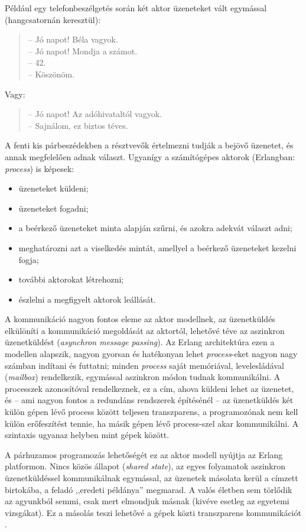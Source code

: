 \documentclass[12pt, a4paper, oneside]{book}
\begin{document}
Például egy telefonbeszélgetés során két aktor üzeneteket vált egymással
(hangcsatornán keresztül):

\begin{quote}
-- Jó napot! Béla vagyok.\\
-- Jó napot! Mondja a számot.\\
-- 42.\\
-- Köszönöm.
\end{quote}
\par\noindent Vagy:
\begin{quote}
-- Jó napot! Az adóhivataltól vagyok.\\
-- Sajnálom, ez biztos téves.
\end{quote}
\noindent A fenti kis párbeszédekben a résztvevők értelmezni tudják a bejövő
üzenetet, és annak megfelelően adnak választ. Ugyanígy a számítógépes 
aktorok (Erlangban: \emph{process}) is képesek:
\begin{itemize}
  \item üzeneteket küldeni;
  \item üzeneteket fogadni;
  \item a beérkező üzeneteket minta alapján szűrni, és azokra adekvát választ
adni;
  \item meghatározni azt a viselkedés mintát, amellyel a beérkező üzeneteket
kezelni fogja;
  \item további aktorokat létrehozni;
  \item észlelni a megfigyelt aktorok leállását. 
\end{itemize}

A kommunikáció nagyon fontos eleme az aktor modellnek, az üzenetküldés
elkülöníti a kommunikáció megoldását az aktortól, lehetővé téve az aszinkron
üzenetküldést (\emph{asynchron message passing}). Az Erlang architektúra ezen a
modellen alapszik, nagyon gyorsan és hatékonyan lehet \emph{process}-eket
nagyon nagy számban indítani és futtatni; minden \emph{process} saját
memóriával, levelesládával (\emph{mailbox}) rendelkezik, egymással aszinkron
módon tudnak kommunikálni. A processzek azonosítóval rendelkeznek, ez a cím,
ahova küldeni lehet az üzenetet, és -- ami nagyon fontos a redundáns rendszerek
építésénél -- az üzenetküldés két külön gépen lévő process között teljesen
transzparens, a programozónak nem kell külön erőfeszítést tennie, ha másik
gépen lévő process-szel akar kommunikálni. A szintaxis ugyanaz helyben mint gépek
között.

A párhuzamos programozás lehetőségét ez az aktor modell nyújtja az Erlang
platformon. Nincs közös állapot (\emph{shared state}), az egyes folyamatok
aszinkron üzenetküldéssel kommunikálnak egymással, az üzenetek másolata kerül a
címzett birtokába, a feladó ,,eredeti példánya'' megmarad. A valós életben sem
törlődik az agyunkból semmi, csak mert elmondjuk másnak (kivéve esetleg az
egyetemi vizsgákat). Ez a másolás teszi lehetővé a gépek közti transzparens
kommunikációt \citep{CesariniBook}.
\end{document}
